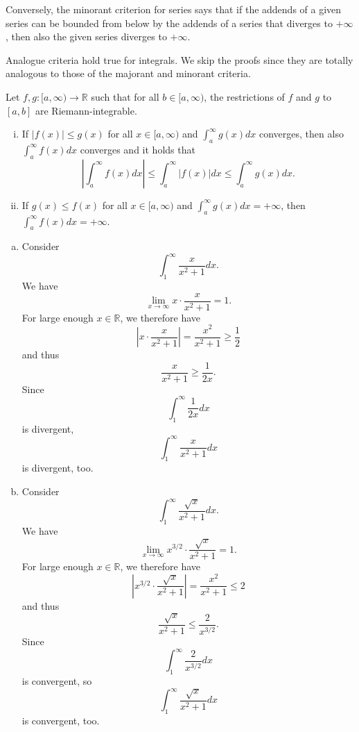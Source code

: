 Conversely, the minorant criterion for series says that if the addends of a given series can be bounded from below by the addends 
of a series that diverges to $+\infty$, then also the given series diverges to $+\infty$.

Analogue criteria hold true for integrals. We skip the proofs since they are totally analogous to those of the majorant and minorant criteria.

\begin{Theorem}{}
Let $f,g:[a,\infty)\to\mathbb{R}$ such that for all $b\in [a,\infty)$, the restrictions of $f$ and $g$ to $[a,b]$ are Riemann-integrable.
\begin{enumerate}[(i)]
\item If $|f(x)|\leq g(x)$ for all $x\in [a,\infty)$ and $\int_{a}^\infty g(x)dx$ converges, then also $\int_{a}^\infty f(x)dx$ converges
and it holds that
\[
\left|\int_{a}^\infty f(x)dx\right|\leq \int_{a}^\infty |f(x)|dx\leq \int_{a}^\infty g(x)dx.
\]
\item If $g(x)\leq f(x)$ for all $x\in [a,\infty)$ and $\int_{a}^\infty g(x)dx=+\infty$, then $\int_{a}^\infty f(x)dx=+\infty$.
\end{enumerate}
\end{Theorem}





\begin{example}
\begin{enumerate}[a)]
\item Consider
\[\int_1^\infty\frac{x}{x^2+1}dx.\]
We have
\[\lim_{x\to\infty}x\cdot\frac{x}{x^2+1}=1.\]
For large enough $x\in\mathbb{R}$, we therefore have
\[\left|x\cdot\frac{x}{x^2+1}\right|=\frac{x^2}{x^2+1}\geq\frac12\]
and thus
\[\frac{x}{x^2+1}\geq\frac1{2x}.\]
Since
\[\int_1^\infty\frac{1}{2x}dx\]
is divergent,
\[\int_1^\infty\frac{x}{x^2+1}dx\]
is divergent, too.
\item Consider
\[\int_1^\infty\frac{\sqrt{x}}{x^2+1}dx.\]
We have
\[\lim_{x\to\infty}x^{3/2}\cdot\frac{\sqrt{x}}{x^2+1}=1.\]
For large enough $x\in\mathbb{R}$, we therefore have
\[\left|x^{3/2}\cdot\frac{\sqrt{x}}{x^2+1}\right|=\frac{x^2}{x^2+1}\leq2\]
and thus
\[\frac{\sqrt{x}}{x^2+1}\leq\frac2{x^{3/2}}.\]
Since
\[\int_1^\infty\frac2{x^{3/2}}dx\]
is convergent, so
\[\int_1^\infty\frac{\sqrt{x}}{x^2+1}dx\]
is convergent, too.
\end{enumerate}
\end{example}






